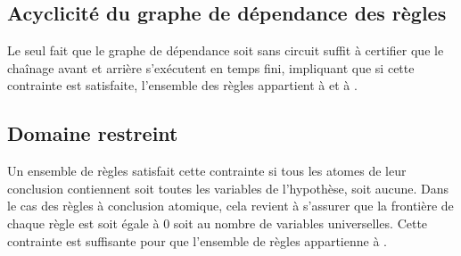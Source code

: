 \subsection{Acyclicité du graphe de dépendance des règles}\label{classe_agrd}
Le seul fait que le graphe de dépendance soit sans circuit suffit à certifier que le chaînage
avant et arrière s'exécutent en temps fini, impliquant que si cette contrainte est satisfaite,
l'ensemble des règles appartient à \fes et à \fus.

\subsection{Domaine restreint}\label{classe_dr}
Un ensemble de règles satisfait cette contrainte si tous les atomes de leur conclusion
contiennent soit toutes les variables de l'hypothèse, soit aucune.
Dans le cas des règles à conclusion atomique, cela revient à s'assurer que la frontière
de chaque règle est soit égale à 0 soit au nombre de variables universelles.
Cette contrainte est suffisante pour que l'ensemble de règles appartienne à \fus.


